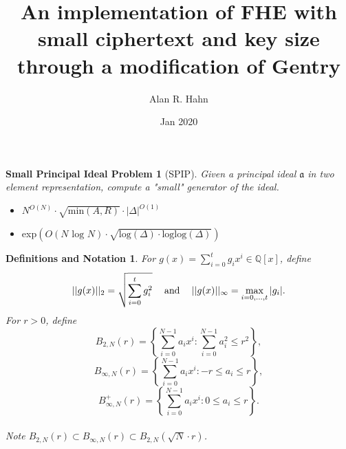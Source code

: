 \documentclass{beamer}
\title[FHE Implementation]{An implementation of FHE with small ciphertext and key size through a modification of Gentry}
\author{Alan R. Hahn}
\institute{Technische Universit{\"a}t Kaiserslautern}
\date{Jan 2020}
\newtheorem{defsnota}{Definitions and Notation}
\newtheorem{SPIP}{Small Principal Ideal Problem}
\begin{document}
\begin{frame}
  \titlepage
\end{frame}


\begin{frame}
\begin{small}
\begin{SPIP}[SPIP]
Given a principal ideal $\mathfrak{a}$ in two element representation, compute a "small" generator of the ideal.
\end{SPIP}
\pause
\begin{itemize}
\item $N^{O(N)}\cdot \sqrt{\text{min}(A,R)}\cdot |\Delta|^{O(1)}$
\item exp$(O(N \text{ log } N)\cdot \sqrt{\text{log}(\Delta)\cdot \text{loglog} (\Delta)})$
\end{itemize}
\end{small}
\end{frame}




\begin{frame}
\begin{small}
\begin{defsnota}
For $g(x) = \sum_{i = 0}^{t}g_ix^i\in\mathbb{Q}[x]$, define
\\$$||g(x)||_2 = \sqrt{\sum_{i = 0}^{t}g_i^2} \text{ \hspace{2mm}    and \hspace{2mm}    } ||g(x)||_{\infty} = \max\limits_{i = 0,...,t}|g_i|.$$
\pause
For $r>0$, define
$$B_{2,N}(r) = \left\{ \sum_{i = 0}^{N-1}a_ix^i: \sum_{i = 0}^{N-1}a_i^2\leq r^2\right\},$$
$$B_{\infty, N}(r) = \left\{ \sum_{i = 0}^{N-1}a_ix^i: -r\leq a_i\leq r\right\},$$
$$B_{\infty, N}^+(r) = \left\{ \sum_{i = 0}^{N-1}a_ix^i: 0\leq a_i\leq r\right\}.$$
\vspace{2mm}
\pause
\\Note $B_{2,N}(r) \subset B_{\infty, N}(r) \subset B_{2,N}(\sqrt{N}\cdot r)$.

\end{defsnota}
\end{small}
\end{frame}
\end{document}
